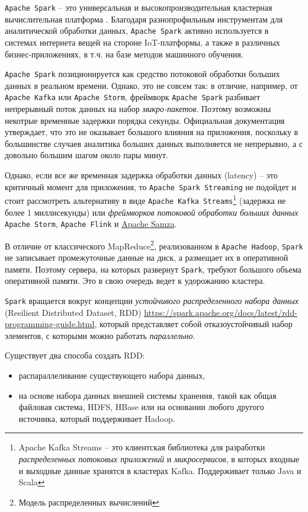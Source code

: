 \documentclass[%
	11pt,
	a4paper,
	utf8,
		]{article}
\begin{document}
\texttt{Apache Spark} -- это универсальная и высокопроизводительная кластерная вычислительная платформа \cite{carey:spark-2015}. Благодаря разнопрофильным инструментам для аналитической обработки данных, \texttt{Apache Spark} активно используется в системах интернета вещей на стороне IoT-платформы, а также в различных бизнес-приложениях, в т.ч. на базе методов машинного обучения.

\texttt{Apache Spark} позиционируется как средство потоковой обработки больших данных в реальном времени. Однако, это не совсем так: в отличие, например, от \texttt{Apache Kafka} или \texttt{Apache Storm}, фреймворк \texttt{Apache Spark} разбивает непрерывный поток данных на набор \emph{микро-пакетов}. Поэтому возможны некотрые временные задержки порядка секунды. Официальная документация утверждает, что это не оказывает большого влияния на приложения, поскольку в большинстве случаев аналитика больших данных выполняется не непрерывно, а с довольно большим шагом около пары минут. 

Однако, если все же временная задержка обработки данных (latency) -- это критичный момент для приложения, то \texttt{Apache Spark Streaming} не подойдет и стоит рассмотреть альтернативу в виде \texttt{Apache Kafka Streams}\footnote{Apache Kafka Streams -- это клиентская библиотека для разработки \emph{распределенных потоковых приложений} и \emph{микросервисов}, в которых входные и выходные данные хранятся в кластерах Kafka. Поддерживает только Java и Scala} (задержка не более 1 миллисекунды) или \emph{фреймворков потоковой обработки больших данных} \texttt{Apache Storm}, \texttt{Apache Flink} и \href{https://samza.apache.org/}{\ttfamily Apache Samza}.

В отличие от классического MapReduce\footnote{Модель распределенных вычислений}, реализованном в \texttt{Apache Hadoop}, \texttt{Spark} не записывает промежуточные данные на диск, а размещает их в оперативной памяти. Поэтому сервера, на которых развернут \texttt{Spark}, требуют большого объема оперативной памяти. Это в свою очередь ведет к удорожанию кластера. 

\texttt{Spark} вращается вокруг концепции \emph{устойчивого распределенного набора данных} (Resilient Distributed Dataset, {RDD}) \url{https://spark.apache.org/docs/latest/rdd-programming-guide.html}, который представляет собой отказоустойчивый набор элементов, с которыми можно работать \emph{параллельно}.

Существует два способа создать RDD:

\begin{itemize}
	\item распараллеливание существующего набора данных,
	
	\item на основе набора данных внешней системы хранения, такой как общая файловая система, HDFS, HBase или на основании любого другого источника, который поддерживает Hadoop.
\end{itemize}
\end{document}
